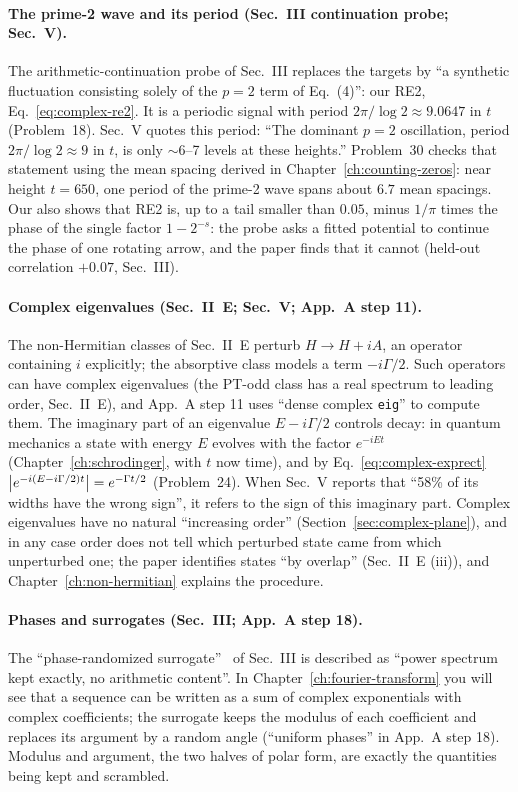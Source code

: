 \paragraph{The prime-2 wave and its period (Sec.~III continuation probe; Sec.~V).} The arithmetic-continuation probe of Sec.~III replaces the targets by ``a synthetic fluctuation consisting solely of the $p{=}2$ term of Eq.~(4)'': our RE2, Eq.~\eqref{eq:complex-re2}. It is a periodic signal with period $2\pi/\log 2\approx9.0647$ in $t$ (Problem~18). Sec.~V quotes this period: ``The dominant $p{=}2$ oscillation, period $2\pi/\log 2\approx9$ in $t$, is only $\sim$6--7 levels at these heights.'' Problem~30 checks that statement using the mean spacing derived in Chapter~\ref{ch:counting-zeros}: near height $t=650$, one period of the prime-2 wave spans about $6.7$ mean spacings. Our  also shows that RE2 is, up to a tail smaller than $0.05$, minus $1/\pi$ times the phase of the single factor $1-2^{-s}$: the probe asks a fitted potential to continue the phase of one rotating arrow, and the paper finds that it cannot (held-out correlation $+0.07$, Sec.~III).

\paragraph{Complex eigenvalues (Sec.~II~E; Sec.~V; App.~A step 11).} The non-Hermitian classes of Sec.~II~E perturb $H\to H+iA$, an operator containing $i$ explicitly; the absorptive class models a term $-i\Gamma/2$. Such operators can have complex eigenvalues (the PT-odd class has a real spectrum to leading order, Sec.~II~E), and App.~A step 11 uses ``dense complex \texttt{eig}'' to compute them. The imaginary part of an eigenvalue $E-i\Gamma/2$ controls decay: in quantum mechanics a state with energy $E$ evolves with the factor $e^{-iEt}$ (Chapter~\ref{ch:schrodinger}, with $t$ now time), and by Eq.~\eqref{eq:complex-exprect} $\left\lvert e^{-i(E-i\Gamma/2)t}\right\rvert=e^{-\Gamma t/2}$ (Problem~24). When Sec.~V reports that ``58\% of its widths have the wrong sign'', it refers to the sign of this imaginary part. Complex eigenvalues have no natural ``increasing order'' (Section~\ref{sec:complex-plane}), and in any case order does not tell which perturbed state came from which unperturbed one; the paper identifies states ``by overlap'' (Sec.~II~E (iii)), and Chapter~\ref{ch:non-hermitian} explains the procedure.

\paragraph{Phases and surrogates (Sec.~III; App.~A step 18).} The ``phase-randomized surrogate''~\cite{theiler} of Sec.~III is described as ``power spectrum kept exactly, no arithmetic content''. In Chapter~\ref{ch:fourier-transform} you will see that a sequence can be written as a sum of complex exponentials with complex coefficients; the surrogate keeps the modulus of each coefficient and replaces its argument by a random angle (``uniform phases'' in App.~A step 18). Modulus and argument, the two halves of polar form, are exactly the quantities being kept and scrambled.

